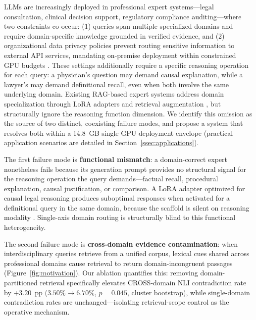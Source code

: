 \documentclass[a4paper,fleql,doubleblind]{cas-sc}
\begin{document}
LLMs are increasingly deployed in professional expert systems---legal consultation,
clinical decision support, regulatory compliance auditing---where two constraints
co-occur: (1) queries span multiple specialized domains and require domain-specific
knowledge grounded in verified evidence, and (2) organizational data privacy policies
prevent routing sensitive information to external API services, mandating on-premise
deployment within constrained GPU budgets \citep{brown2020gpt,singhal2023large,guha2023legalbench}.
These settings additionally require a specific reasoning operation for each query:
a physician's question may demand causal explanation, while a lawyer's may demand
definitional recall, even when both involve the same underlying domain.
Existing RAG-based expert systems address domain specialization through LoRA adapters
and retrieval augmentation \citep{hu2022lora,shazeer2017outrageously,dou2024loramoe},
but structurally ignore the reasoning function dimension.
We identify this omission as the source of two distinct, coexisting failure modes,
and propose a system that resolves both within a 14.8~GB single-GPU deployment envelope
(practical application scenarios are detailed in Section~\ref{ssec:applications}).

The first failure mode is \textbf{functional mismatch}: a domain-correct expert
nonetheless fails because its generation prompt provides no structural signal
for the reasoning operation the query demands---factual recall, procedural
explanation, causal justification, or comparison.
A LoRA adapter optimized for causal legal reasoning produces suboptimal responses
when activated for a definitional query in the same domain, because the scaffold
is silent on reasoning modality \citep{singhal2023large,guha2023legalbench}.
Single-axis domain routing is structurally blind to this functional heterogeneity.

The second failure mode is \textbf{cross-domain evidence contamination}: when
interdisciplinary queries retrieve from a unified corpus, lexical cues shared
across professional domains cause retrieval to return domain-incongruent passages
(Figure~\ref{fig:motivation}).
Our ablation quantifies this: removing domain-partitioned retrieval specifically
elevates CROSS-domain NLI contradiction rate by $+3.20$~pp
($3.50\%{\to}6.70\%$, $p{=}0.045$, cluster bootstrap), while single-domain
contradiction rates are unchanged---isolating retrieval-scope control as the
operative mechanism.
\end{document}
